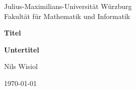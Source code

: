 \begin{titlepage}
  Julius-Maximilians-Universität Würzburg\\
  Fakultät für Mathematik und Informatik
  
  \vspace{3cm}
  
  \begin{center}
   \LARGE\textbf{Titel}
  \end{center}
  
  \vspace{0cm}
  
  \begin{center}
   \huge\textbf{Untertitel}
  \end{center}
  
  \vspace{1cm}
  
  \begin{center}
   \Large Nils Wisiol
  \end{center}
  
  \vspace{0cm}
  
  \begin{center}
   \Large \today
  \end{center}
  
  
\end{titlepage}

